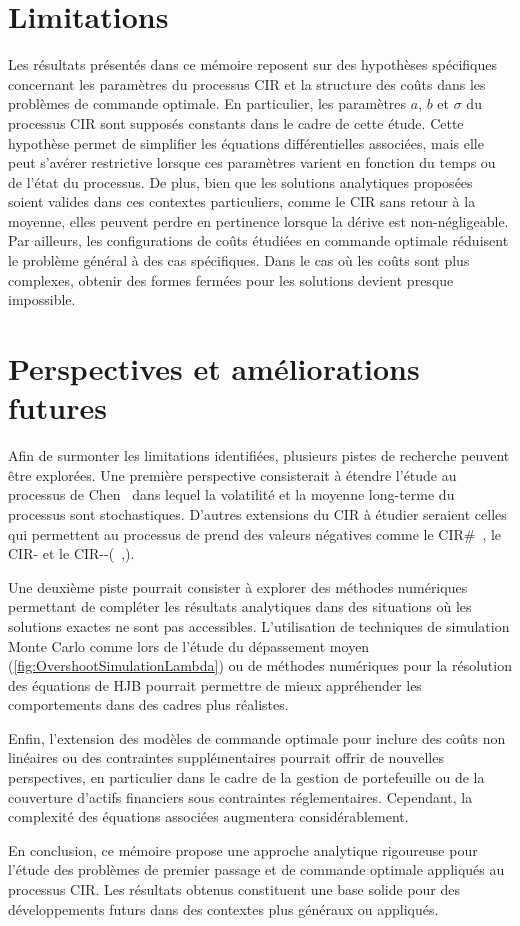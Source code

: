 \section{Limitations}

Les résultats présentés dans ce mémoire reposent sur des hypothèses spécifiques concernant les paramètres du processus CIR et la structure des coûts dans les problèmes de commande optimale. En particulier, les paramètres \(a\), \(b\) et \(\sigma\) du processus \acs{CIR} sont supposés constants dans le cadre de cette étude. Cette hypothèse permet de simplifier les équations différentielles associées, mais elle peut s'avérer restrictive lorsque ces paramètres varient en fonction du temps ou de l'état du processus. De plus, bien que les solutions analytiques proposées soient valides dans ces contextes particuliers, comme le \acs{CIR} sans retour à la moyenne, elles peuvent perdre en pertinence lorsque la dérive est non-négligeable. Par ailleurs, les configurations de coûts étudiées en commande optimale réduisent le problème général à des cas spécifiques. Dans le cas où les coûts sont plus complexes, obtenir des formes fermées pour les solutions devient presque impossible.

\section{Perspectives et améliorations futures}

Afin de surmonter les limitations identifiées, plusieurs pistes de recherche peuvent être explorées. Une première perspective consisterait à étendre l'étude au processus de Chen~\cite{chen1996} dans lequel la volatilité et la moyenne long-terme du processus sont stochastiques. D'autres extensions du \acs{CIR} à étudier seraient celles qui permettent au processus de prend des valeurs négatives comme le CIR\#~\cite{orlando2019}, le CIR- et le CIR-{}-(~\cite{difrancesco2021},\cite{difrancesco2022}).

Une deuxième piste pourrait consister à explorer des méthodes numériques permettant de compléter les résultats analytiques dans des situations où les solutions exactes ne sont pas accessibles. L'utilisation de techniques de simulation Monte Carlo comme lors de l'étude du dépassement moyen (\ref{fig:OvershootSimulationLambda}) ou de méthodes numériques pour la résolution des équations de \acs{HJB} pourrait permettre de mieux appréhender les comportements dans des cadres plus réalistes.

Enfin, l'extension des modèles de commande optimale pour inclure des coûts non linéaires ou des contraintes supplémentaires pourrait offrir de nouvelles perspectives, en particulier dans le cadre de la gestion de portefeuille ou de la couverture d'actifs financiers sous contraintes réglementaires. Cependant, la complexité des équations associées augmentera considérablement.

En conclusion, ce mémoire propose une approche analytique rigoureuse pour l'étude des problèmes de premier passage et de commande optimale appliqués au processus \acs{CIR}. Les résultats obtenus constituent une base solide pour des développements futurs dans des contextes plus généraux ou appliqués.